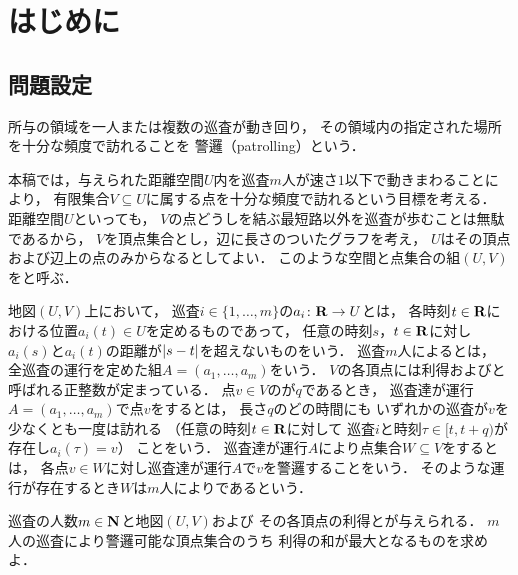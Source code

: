 \chapter{はじめに}
\label{chapter: introduction}

\section{問題設定}
\label{section: problemDefinition}
所与の領域を一人または複数の巡査が動き回り，
その領域内の指定された場所を十分な頻度で訪れることを
警邏（patrolling）という\cite{
  Dumitrescu:2014:CGC:2636805.2636822,
  chen2013fence,
  coene2011charlemagne,
  czyzowicz2011boundary}．

本稿では，与えられた距離空間$U$内を巡査$m$人が速さ$1$以下で動きまわることにより，
有限集合$V \subseteq U$に属する点を十分な頻度で訪れるという目標を考える．
距離空間$U$といっても，
$V$の点どうしを結ぶ最短路以外を巡査が歩むことは無駄であるから，
$V$を頂点集合とし，辺に長さのついたグラフを考え，
$U$はその頂点および辺上の点のみからなるとしてよい．
このような空間と点集合の組$(U, V)$をと呼ぶ．

地図$(U, V)$上において，
巡査$i \in \{1, \ldots, m\}$の$a _i \colon \mathbf R \to U$とは，
各時刻$t \in \mathbf R$における位置$a _i (t) \in U$を定めるものであって，
任意の時刻$s$，$t \in \mathbf R$に対し$a _i (s)$と$a _i (t)$の距離が$\lvert{s - t}\rvert$を超えないものをいう．
巡査$m$人によるとは，
全巡査の運行を定めた組$A = (a _1, \dots, a _m)$をいう．
$V$の各頂点には利得および{\maxIdletime}と呼ばれる正整数が定まっている．
点$v \in V$の{\maxIdletime}が$q$であるとき，
巡査達が運行$A = (a _1, \dots, a _m)$で点$v$をするとは，
長さ$q$のどの時間にも
いずれかの巡査が$v$を少なくとも一度は訪れる
（任意の時刻$t \in \mathbf R$に対して
巡査$i$と時刻$\tau \in [t, t + q)$が存在し$a _i (\tau) = v$）
ことをいう．
巡査達が運行$A$により点集合$W \subseteq V$をするとは，
各点$v \in W$に対し巡査達が運行$A$で$v$を警邏することをいう．
そのような運行が存在するとき$W$は$m$人によりであるという．

\begin{patrollingProblem}
  巡査の人数$m \in \mathbf N$と地図$(U, V)$および
  その各頂点の利得と{\maxIdletime}が与えられる．
  $m$人の巡査により警邏可能な頂点集合のうち
  利得の和が最大となるものを求めよ．
\end{patrollingProblem}

